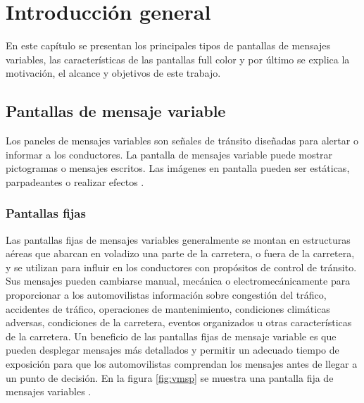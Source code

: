 
\chapter{Introducción general} %

\label{Chapter1} %
\label{IntroGeneral}
En este capítulo se presentan los principales tipos de pantallas de mensajes variables, las características de las pantallas full color y por último se explica la motivación, el alcance y objetivos de este trabajo.

\newcommand{\keyword}[1]{\textbf{#1}}
\newcommand{\tabhead}[1]{\textbf{#1}}
\newcommand{\code}[1]{\texttt{#1}}
\newcommand{\file}[1]{\texttt{\bfseries#1}}
\newcommand{\option}[1]{\texttt{\itshape#1}}
\newcommand{\grados}{$^{\circ}$}



\section{Pantallas de mensaje variable}

Los paneles de mensajes variables son señales de tránsito diseñadas para alertar o informar a los conductores. La pantalla de mensajes variable puede mostrar pictogramas o mensajes escritos. Las imágenes en pantalla pueden ser estáticas, parpadeantes o realizar efectos \cite{WIKIVMS}.


\subsection{Pantallas fijas}

Las pantallas fijas de mensajes variables generalmente se montan en estructuras aéreas que abarcan en voladizo una parte de la carretera, o fuera de la carretera, y se utilizan para influir en los conductores con propósitos de control de tránsito. Sus mensajes pueden cambiarse manual, mecánica o electromecánicamente para proporcionar a los automovilistas información sobre congestión del tráfico, accidentes de tráfico, operaciones de mantenimiento, condiciones climáticas adversas, condiciones de la carretera, eventos organizados u otras características de la carretera. Un beneficio de las pantallas fijas de mensaje variable es que pueden desplegar mensajes más detallados y permitir un adecuado tiempo de exposición  para que los automovilistas comprendan los mensajes antes de llegar a un punto de decisión. En la figura \ref{fig:vmsp} se muestra una pantalla fija de mensajes variables \citep{VMSTYPES}.


